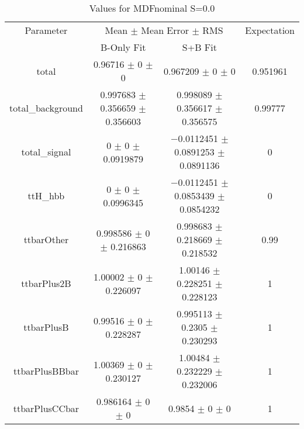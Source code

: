 \begin{table}
\centering
\caption{Values for MDFnominal S=0.0}
\begin{tabular}{cccc}
\toprule
Parameter & \multicolumn{2}{c}{Mean $\pm$ Mean Error $\pm$ RMS} & Expectation\\
 & B-Only Fit & S+B Fit & \\
\midrule
total & \num{0.96716} $\pm$ \num{0} $\pm$ \num{0} & \num{0.967209} $\pm$ \num{0} $\pm$ \num{0} & \num{0.951961}\\
total\_background & \num{0.997683} $\pm$ \num{0.356659} $\pm$ \num{0.356603} & \num{0.998089} $\pm$ \num{0.356617} $\pm$ \num{0.356575} & \num{0.99777}\\
total\_signal & \num{0} $\pm$ \num{0} $\pm$ \num{0.0919879} & \num{-0.0112451} $\pm$ \num{0.0891253} $\pm$ \num{0.0891136} & \num{0}\\
ttH\_hbb & \num{0} $\pm$ \num{0} $\pm$ \num{0.0996345} & \num{-0.0112451} $\pm$ \num{0.0853439} $\pm$ \num{0.0854232} & \num{0}\\
ttbarOther & \num{0.998586} $\pm$ \num{0} $\pm$ \num{0.216863} & \num{0.998683} $\pm$ \num{0.218669} $\pm$ \num{0.218532} & \num{0.99}\\
ttbarPlus2B & \num{1.00002} $\pm$ \num{0} $\pm$ \num{0.226097} & \num{1.00146} $\pm$ \num{0.228251} $\pm$ \num{0.228123} & \num{1}\\
ttbarPlusB & \num{0.99516} $\pm$ \num{0} $\pm$ \num{0.228287} & \num{0.995113} $\pm$ \num{0.2305} $\pm$ \num{0.230293} & \num{1}\\
ttbarPlusBBbar & \num{1.00369} $\pm$ \num{0} $\pm$ \num{0.230127} & \num{1.00484} $\pm$ \num{0.232229} $\pm$ \num{0.232006} & \num{1}\\
ttbarPlusCCbar & \num{0.986164} $\pm$ \num{0} $\pm$ \num{0} & \num{0.9854} $\pm$ \num{0} $\pm$ \num{0} & \num{1}\\
\bottomrule
\end{tabular}
\end{table}